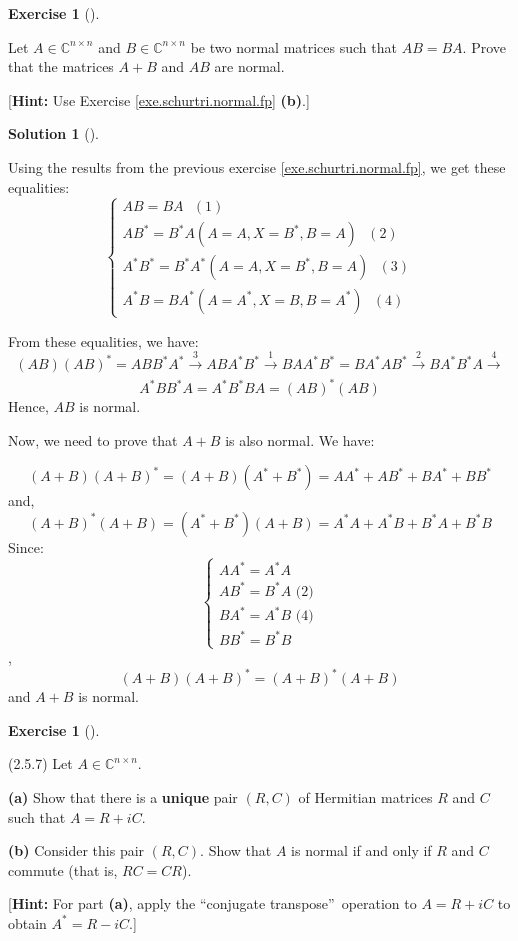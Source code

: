 \documentclass[numbers=enddot,12pt,final,onecolumn,notitlepage]{scrartcl}
\newcounter{exer}
\newcounter{sol}
\theoremstyle{definition}
\newtheorem{exmp}[exer]{Exercise}
\newenvironment{exercise}[1][]
{\begin{exmp}[#1]\begin{leftbar}}
        {\end{leftbar}\end{exmp}}
\newtheorem{solu}[sol]{Solution}
\newenvironment{solution}[1][]
{\begin{solu}[#1]\begin{leftbar}}
        {\end{leftbar}\end{solu}}
\begin{document}
\begin{exercise}
	 Let $A\in\mathbb{C}^{n\times n}$ and $B\in\mathbb{C}^{n\times n}$ be
	two normal matrices such that $AB=BA$. Prove that the matrices $A+B$ and $AB$
	are normal. \medskip

	[\textbf{Hint:} Use Exercise \ref{exe.schurtri.normal.fp} \textbf{(b)}.]
\end{exercise}

\begin{solution}
	Using the results from the previous exercise \ref{exe.schurtri.normal.fp}, we get these equalities:
	\[
		\begin{cases}
			AB = BA \text{   } (1)                                                    \\
			AB^{\ast} = B^{\ast}A (A=A, X=B^{\ast}, B=A) \text{   } (2)               \\
			A^{\ast}B^{\ast} = B^{\ast}A^{\ast} (A=A, X=B^{\ast}, B=A) \text{   } (3) \\
			A^{\ast}B = BA^{\ast} (A=A^{\ast}, X=B, B=A^{\ast}) \text{   } (4)
		\end{cases}
	\]

	From these equalities, we have:
	\[
		(AB)(AB)^{\ast} = ABB^{\ast}A^{\ast} \xrightarrow[]{\text{3}} ABA^{\ast}B^{\ast} \xrightarrow[]{\text{1}} BAA^{\ast}B^{\ast} = BA^{\ast}AB^{\ast} \xrightarrow[]{\text{2}} BA^{\ast}B^{\ast}A \xrightarrow[]{\text{4}}
	\]
	\[
		A^{\ast}BB^{\ast}A = A^{\ast}B^{\ast}BA = (AB)^{\ast}(AB)
	\]
	Hence, $AB$ is normal.

	Now, we need to prove that $A + B$ is also normal. We have:

	\[
		(A + B)(A + B)^{\ast} = (A + B)(A^{\ast} + B^{\ast}) = AA^{\ast} + AB^{\ast} + BA^{\ast} + BB^{\ast}
	\]
	and,
	\[
		(A + B)^{\ast}(A + B) = (A^{\ast} + B^{\ast})(A + B) = A^{\ast}A + A^{\ast}B + B^{\ast}A + B^{\ast}B
	\]
	Since:
	\[
		\begin{cases}
			AA^{\ast} = A^{\ast}A              \\
			AB^{\ast} = B^{\ast}A \text{  (2)} \\
			BA^{\ast} = A^{\ast}B \text{  (4)} \\
			BB^{\ast} = B^{\ast}B
		\end{cases}
	\],
	\[
		(A + B)(A + B)^{\ast} = (A + B)^{\ast}(A + B)
	\]
	and $A + B$ is normal.

\end{solution}

\begin{exercise}
	 (2.5.7) Let $A\in\mathbb{C}^{n\times n}$. \medskip

	\textbf{(a)} Show that there is a \textbf{unique} pair $\left(  R,C\right)  $
	of Hermitian matrices $R$ and $C$ such that $A=R+iC$. \medskip

	\textbf{(b)} Consider this pair $\left(  R,C\right)  $. Show that $A$ is
	normal if and only if $R$ and $C$ commute (that is, $RC=CR$). \medskip

	[\textbf{Hint:} For part \textbf{(a)}, apply the \textquotedblleft conjugate
		transpose\textquotedblright\ operation to $A=R+iC$ to obtain $A^{\ast}=R-iC$.]
\end{exercise}
\end{document}

